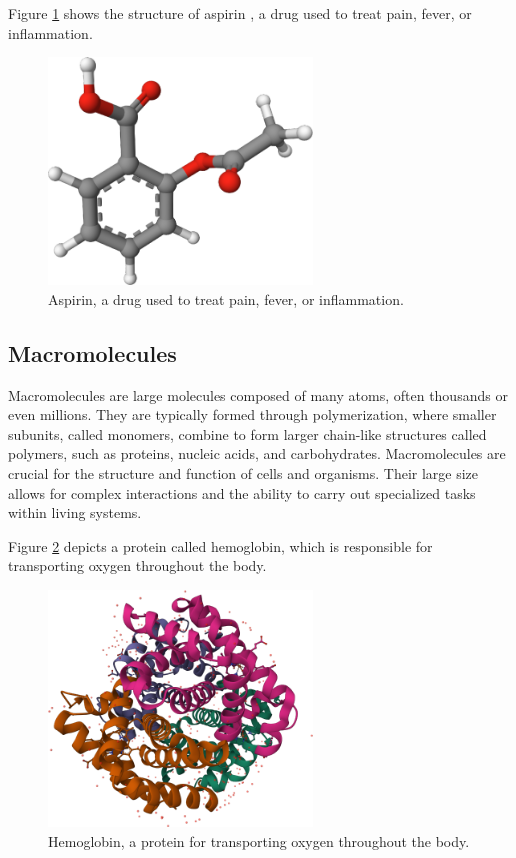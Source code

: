 \documentclass[
  digital,     %
  oneside,     %
  nosansbold,  %
  nocolorbold, %
  lof,         %
  lot,         %
]{fithesis4}
\begin{document}
Figure \ref{fig:aspirin} shows the structure of aspirin \cite{pubchem_aspirin}, a drug used to treat pain, fever, or inflammation.

\begin{figure}[htbp]
  \begin{center}
    \includegraphics[width=7cm]{figures/aspirin.png}
  \end{center}
  \caption{Aspirin, a drug used to treat pain, fever, or inflammation.}
  \label{fig:aspirin}
\end{figure}

\subsection{Macromolecules}

Macromolecules are large molecules composed of many atoms, often thousands or even millions. They are typically formed through polymerization, where smaller subunits, called monomers, combine to form larger chain-like structures called polymers, such as proteins, nucleic acids, and carbohydrates. Macromolecules are crucial for the structure and function of cells and organisms. Their large size allows for complex interactions and the ability to carry out specialized tasks within living systems. \cite{clark2018biology,gu2009structural}

 Figure \ref{fig:hemoglobin} depicts a protein called hemoglobin, which is responsible for transporting oxygen throughout the body.

\begin{figure}[htbp]
  \begin{center}
    \includegraphics[width=7cm]{figures/hemoglobin.png}
  \end{center}
  \caption[Hemoglobin protein.]{Hemoglobin, a protein for transporting oxygen throughout the body.}
  \label{fig:hemoglobin}
\end{figure}
\end{document}
